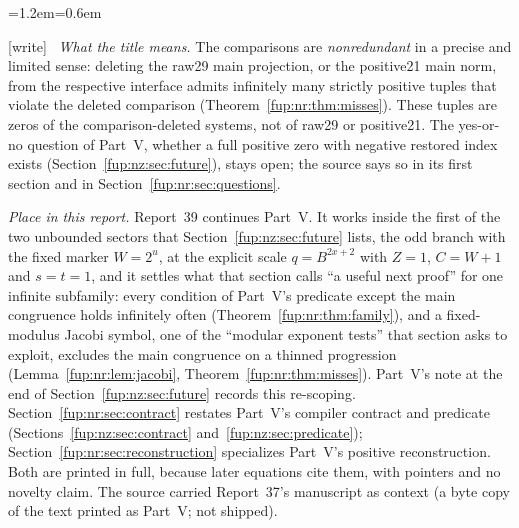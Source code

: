 \documentclass[11pt,letterpaper]{article}
\theoremstyle{definition}\newtheorem{definition}[theorem]{Definition}
\theoremstyle{remark}\newtheorem{remark}[theorem]{Remark}
\newcommand{\wtag}{\textup{[write]}}
\newenvironment{writenote}{\par\smallskip\begin{list}{}{\leftmargin=1.2em\rightmargin=0.6em}\item[]\small\wtag\ }{\end{list}\smallskip}
\begin{document}
\begin{writenote}
\emph{What the title means.} The comparisons are \emph{nonredundant} in a precise and limited sense: deleting the raw29 main projection, or the positive21 main norm, from the respective interface admits infinitely many strictly positive tuples that violate the deleted comparison (Theorem~\ref{fup:nr:thm:misses}). These tuples are zeros of the comparison-deleted systems, not of raw29 or positive21. The yes-or-no question of Part~V, whether a full positive zero with negative restored index exists (Section~\ref{fup:nz:sec:future}), stays open; the source says so in its first section and in Section~\ref{fup:nr:sec:questions}.

\emph{Place in this report.} Report~39 continues Part~V. It works inside the first of the two unbounded sectors that Section~\ref{fup:nz:sec:future} lists, the odd branch with the fixed marker $W=2^u$, at the explicit scale $q=B^{2x+2}$ with $Z=1$, $C=W+1$ and $s=t=1$, and it settles what that section calls ``a useful next proof'' for one infinite subfamily: every condition of Part~V's predicate except the main congruence holds infinitely often (Theorem~\ref{fup:nr:thm:family}), and a fixed-modulus Jacobi symbol, one of the ``modular exponent tests'' that section asks to exploit, excludes the main congruence on a thinned progression (Lemma~\ref{fup:nr:lem:jacobi}, Theorem~\ref{fup:nr:thm:misses}). Part~V's note at the end of Section~\ref{fup:nz:sec:future} records this re-scoping. Section~\ref{fup:nr:sec:contract} restates Part~V's compiler contract and predicate (Sections~\ref{fup:nz:sec:contract} and~\ref{fup:nz:sec:predicate}); Section~\ref{fup:nr:sec:reconstruction} specializes Part~V's positive reconstruction. Both are printed in full, because later equations cite them, with pointers and no novelty claim. The source carried Report~37's manuscript as context (a byte copy of the text printed as Part~V; not shipped).


\end{writenote}
\end{document}
